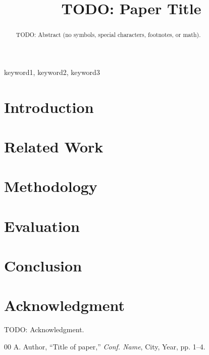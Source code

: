 \documentclass[10pt, conference, letterpaper]{IEEEtran}
\begin{document}
\title{TODO: Paper Title}

\author{
}

\maketitle

\begin{abstract}
TODO: Abstract (no symbols, special characters, footnotes, or math).
\end{abstract}

\begin{IEEEkeywords}
keyword1, keyword2, keyword3
\end{IEEEkeywords}

\section{Introduction}
\label{sec:intro}


\section{Related Work}
\label{sec:related}


\section{Methodology}
\label{sec:methodology}


\section{Evaluation}
\label{sec:evaluation}


\section{Conclusion}
\label{sec:conclusion}


\section*{Acknowledgment}
TODO: Acknowledgment.

\begin{thebibliography}{00}
 A. Author, ``Title of paper,'' \textit{Conf. Name}, City, Year, pp. 1--4.
\end{thebibliography}
\end{document}
